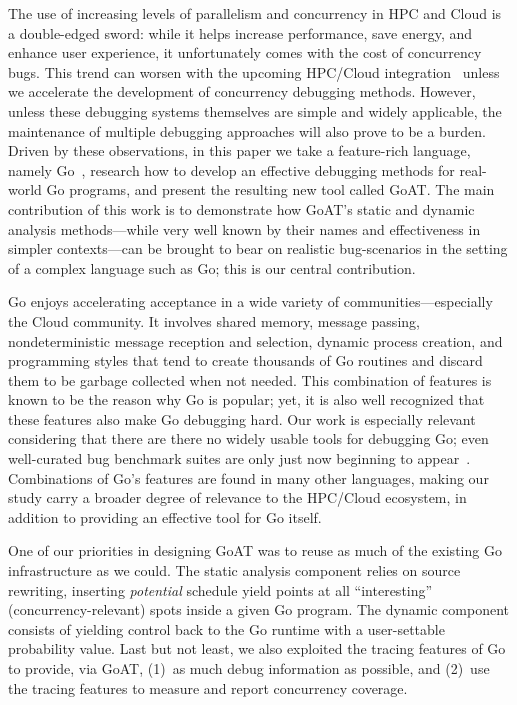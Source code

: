 
The use of increasing levels of parallelism and concurrency in HPC and Cloud
is a double-edged sword: while it helps increase performance, save energy, and
enhance user experience, it
unfortunately comes with the cost of concurrency bugs.
%
This trend can worsen with the upcoming HPC/Cloud
integration~\cite{dan-herbein-dong} unless we accelerate the
development of concurrency debugging methods.
%
However, unless these debugging systems themselves are
simple and widely applicable,
the maintenance of multiple debugging approaches
will also prove to be a burden.
%
Driven by these observations,
in this paper we take a feature-rich language, namely Go~\cite{go-citation},
research how to develop an effective debugging methods for real-world
Go programs, and present the resulting new tool called GoAT.
%
The main contribution of this work is to demonstrate how
GoAT's static and dynamic analysis methods---while very well known
by their names and effectiveness in simpler contexts---can
be brought to bear on realistic bug-scenarios in the setting of
a complex language such as Go; this is our central contribution.


Go enjoys accelerating acceptance in a wide variety of
communities---especially the Cloud community.
%
It involves shared memory, message passing, nondeterministic
message reception and selection,
dynamic process creation,
and programming styles that tend to create thousands of Go routines
and discard them to be garbage collected when not needed.
%
This combination of features is known to be the reason why Go
is popular; yet, it is also well recognized that these features also make
Go debugging hard.
%
Our work is especially relevant considering that
there are there no widely usable tools for debugging Go; even well-curated
bug benchmark suites are only just
now beginning to appear~\cite{tu-concurrentBugs-asplos19,yuan-gobench-cgo21}.
%
Combinations of Go's features are found in many other languages,
making our study carry a broader degree of relevance
to the HPC/Cloud ecosystem, in addition to providing an effective
tool for Go itself.


One of our priorities in designing GoAT
was to reuse as much of the existing Go infrastructure
as we could.
%
The static analysis component relies on source rewriting, inserting
{\em potential} schedule yield points
at all
``interesting'' (concurrency-relevant) spots inside a given Go program.
%
The dynamic component consists of yielding control back
to the Go runtime with a user-settable probability value.
%
Last but not least, we also exploited the tracing features of Go
to provide, via GoAT, (1)~as much debug information as possible, and
(2)~use the tracing features to measure and report concurrency coverage.


